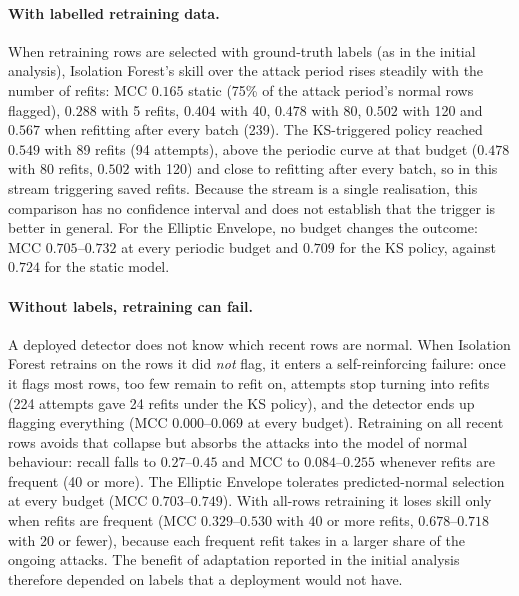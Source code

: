 \documentclass[11pt]{article}
\begin{document}
\paragraph{With labelled retraining data.} When retraining rows are selected with
ground-truth labels (as in the initial analysis), Isolation Forest's skill over the attack
period rises steadily with the number of refits: MCC $0.165$ static (75\% of the attack
period's normal rows flagged), $0.288$ with 5 refits, $0.404$ with 40, $0.478$ with 80,
$0.502$ with 120 and $0.567$ when refitting after every batch (239). The KS-triggered policy
reached $0.549$ with 89 refits (94 attempts), above the periodic curve at that budget
($0.478$ with 80 refits, $0.502$ with 120) and close to refitting after every batch, so in
this stream triggering saved refits. Because the stream is a single realisation, this
comparison has no confidence interval and does not establish that the trigger is better in
general. For the Elliptic
Envelope, no budget changes the outcome: MCC $0.705$--$0.732$ at every periodic budget and
$0.709$ for the KS policy, against $0.724$ for the static model.

\paragraph{Without labels, retraining can fail.} A deployed detector does not know which
recent rows are normal. When Isolation Forest retrains on the rows it did \emph{not} flag,
it enters a self-reinforcing failure: once it flags most rows, too few remain to refit on,
attempts stop turning into refits (224 attempts gave 24 refits under the KS policy), and the
detector ends up flagging everything (MCC $0.000$--$0.069$ at every budget). Retraining on
all recent rows avoids that collapse but absorbs the attacks into the model of normal
behaviour: recall falls to $0.27$--$0.45$ and MCC to $0.084$--$0.255$ whenever refits are
frequent (40 or more). The Elliptic Envelope tolerates predicted-normal selection at every
budget (MCC $0.703$--$0.749$). With all-rows retraining it loses skill only when refits are
frequent (MCC $0.329$--$0.530$ with 40 or more refits, $0.678$--$0.718$ with 20 or fewer),
because each frequent refit takes in a larger share of the ongoing attacks. The benefit of
adaptation reported in the initial analysis therefore depended on labels that a deployment
would not have.
\end{document}
